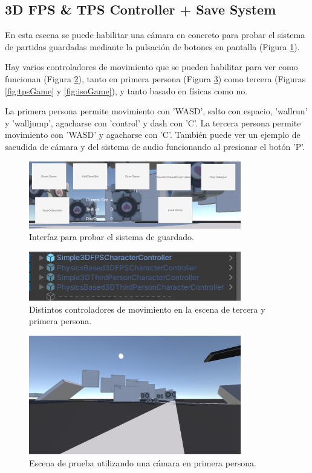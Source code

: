 \subsection{3D FPS \& TPS Controller + Save System}
En esta escena se puede habilitar una cámara en concreto para probar el sistema de partidas guardadas mediante la pulsación de botones en pantalla (Figura 
\ref{fig:savingUI}). 

Hay varios controladores de movimiento que se pueden habilitar para ver como funcionan (Figura \ref{fig:fpscontrollers}), tanto en
 primera persona (Figura \ref{fig:fpsGame}) como tercera (Figuras \ref{fig:tpsGame} y \ref{fig:isoGame}), y tanto basado en físicas como no. 
 
 La primera persona permite movimiento con 'WASD', salto con espacio, 'wallrun' y 'walljump', agacharse con 'control' y dash con 'C'. La tercera persona permite movimiento
  con 'WASD' y agacharse con 'C'. También puede ver un ejemplo de sacudida de cámara y del sistema de audio funcionando al presionar el botón 'P'. 

\begin{figure}[H]
   \centering
     \includegraphics[width=350px,clip=true]{FPSTestSceneSaves.png}
   \caption{Interfaz para probar el sistema de guardado.}
   \label{fig:savingUI}
\end{figure}

\begin{figure}[H]
   \centering
     \includegraphics[width=350px,clip=true]{3dFPSTestSceneControllers.png}
   \caption{Distintos controladores de movimiento en la escena de tercera y primera persona.}
   \label{fig:fpscontrollers}
\end{figure}

\begin{figure}[H]
   \centering
     \includegraphics[width=350px,clip=true]{3DFPSTestScene.png}
   \caption{Escena de prueba utilizando una cámara en primera persona.}
   \label{fig:fpsGame}
\end{figure}

